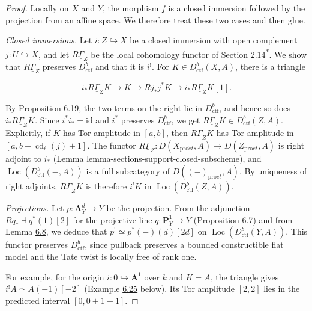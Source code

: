\documentclass[11pt]{article}
\newcommand{\bpout}[1]{#1\textsuperscript{\hyperlink{bp-outside}{\ensuremath{\ast}}}}
\providecommand{\Loc}{}\renewcommand{\Loc}{\operatorname{Loc}}
\begin{document}
\begin{proof}[{Proof}]\label{bp62}%
Locally on \(X\) and \(Y\), the morphism \(f\) is a closed immersion followed by the projection from an affine space. We therefore treat these two cases and then glue.

\emph{Closed immersions.} Let \(i:Z\hookrightarrow X\) be a closed immersion with open complement \(j:U\hookrightarrow X\), and let \(R\underline\Gamma_Z\) be the local cohomology functor of Section \bpout{2.14}. We show that \(R\underline\Gamma_Z\) preserves \(D^b_{\mathrm{ctf}}\) and that it is \(i^!\). For \(K\in D^b_{\mathrm{ctf}}(X,A)\), there is a triangle

\[
i_*R\underline\Gamma_ZK\longrightarrow K\longrightarrow Rj_*j^*K
\longrightarrow i_*R\underline\Gamma_ZK[1].
\]

By Proposition \hyperref[bp58]{6.19}, the two terms on the right lie in \(D^b_{\mathrm{ctf}}\), and hence so does \(i_*R\underline\Gamma_ZK\). Since \(i^*i_*=\mathrm{id}\) and \(i^*\) preserves \(D^b_{\mathrm{ctf}}\), we get \(R\underline\Gamma_ZK\in D^b_{\mathrm{ctf}}(Z,A)\). Explicitly, if \(K\) has Tor amplitude in \([a,b]\), then \(R\underline\Gamma_ZK\) has Tor amplitude in \([a,b+\operatorname{cd}_\ell(j)+1]\). The functor \(R\underline\Gamma_Z:D(X_{\mathrm{pro}\acute{e}t},A)\to D(Z_{\mathrm{pro}\acute{e}t},A)\) is right adjoint to \(i_*\) (Lemma lemma-sections-support-closed-subscheme), and \(\Loc(D^b_{\mathrm{ctf}}(-,A))\) is a full subcategory of \(D((-)_{\mathrm{pro}\acute{e}t},A)\). By uniqueness of right adjoints, \(R\underline\Gamma_ZK\) is therefore \(i^!K\) in \(\Loc(D^b_{\mathrm{ctf}}(Z,A))\).

\emph{Projections.} Let \(p:\mathbf A^d_Y\to Y\) be the projection. From the adjunction \(Rq_*\dashv q^*(1)[2]\) for the projective line \(q:\mathbf P^1_Y\to Y\) (Proposition \hyperref[bp22]{6.7}) and from Lemma \hyperref[bp26]{6.8}, we deduce that \(p^!\simeq p^*(-)(d)[2d]\) on \(\Loc(D^b_{\mathrm{ctf}}(Y,A))\). This functor preserves \(D^b_{\mathrm{ctf}}\), since pullback preserves a bounded constructible flat model and the Tate twist is locally free of rank one.

For example, for the origin \(i:0\hookrightarrow\mathbf A^1\) over \(\bar k\) and \(K=A\), the triangle gives \(i^!A\simeq A(-1)[-2]\) (Example \hyperref[bp79]{6.25} below). Its Tor amplitude \([2,2]\) lies in the predicted interval \([0,0+1+1]\).


\end{proof}
\end{document}
